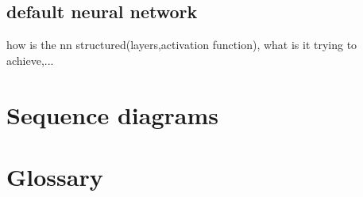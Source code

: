 \documentclass[parskip=full]{scrartcl}
\begin{document}
\subsection{default neural network}
how is the nn structured(layers,activation function), what is it trying to achieve,...


\section{Sequence diagrams}

\section{Glossary}

%
\printnoidxglossaries
\end{document}
